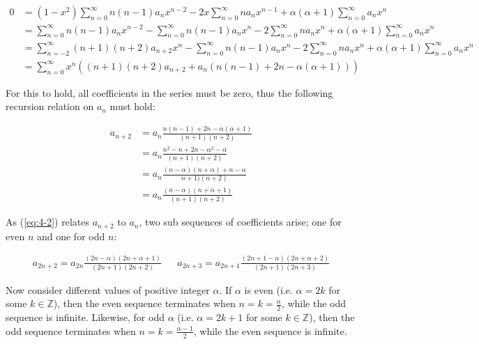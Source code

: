 \documentclass{article}
\begin{document}
\begin{align*}
    0 &= (1 - x^2)\sum\limits_{n = 0}^\infty n(n - 1)a_nx^{n - 2} - 2x\sum\limits_{n = 0}^\infty na_nx^{n - 1} + \alpha(\alpha + 1)\sum\limits_{n = 0}^\infty a_nx^n\\
    &= \sum\limits_{n = 0}^\infty n(n - 1)a_nx^{n - 2} - \sum\limits_{n = 0}^\infty n(n - 1)a_nx^n
        - 2\sum\limits_{n = 0}^\infty na_nx^n + \alpha(\alpha + 1)\sum\limits_{n = 0}^\infty a_nx^n\\
    &= \sum\limits_{n = -2}^\infty(n + 1)(n + 2)a_{n + 2}x^n - \sum\limits_{n = 0}^\infty n(n - 1)a_nx^n
        - 2\sum\limits_{n = 0}^\infty na_nx^n + \alpha(\alpha + 1)\sum\limits_{n = 0}^\infty a_nx^n\\
    &= \sum\limits_{n = 0}^\infty x^n((n + 1)(n + 2)a_{n + 2} + a_n(n(n - 1) + 2n - \alpha(\alpha + 1)))
\end{align*}

For this to hold, all coefficients in the series must be zero, thus the following recursion relation on $a_n$ must hold:

\begin{align}
    a_{n + 2} &= a_n \frac{n(n - 1) + 2n - \alpha(\alpha + 1)}{(n + 1)(n + 2)}\nonumber\\
    &= a_n \frac{n^2 - n + 2n - \alpha^2 - \alpha}{(n + 1)(n + 2)}\nonumber\\
    &= a_n \frac{(n - \alpha)(n + \alpha) + n - \alpha}{n + 1)(n + 2)}\nonumber\\
    &= a_n \frac{(n - \alpha)(n + \alpha + 1)}{(n + 1)(n + 2)} \label{eq:4-2}
\end{align}

As (\ref{eq:4-2}) relates $a_{n + 2}$ to $a_n$, two sub sequences of coefficients arise; one for even $n$ and one for odd $n$:

\begin{align*}
    a_{2n + 2} = a_{2n} \frac{(2n - \alpha)(2n + \alpha + 1)}{(2n + 1)(2n + 2)}
        && a_{2n + 3} = a_{2n + 1} \frac{(2n + 1 - \alpha)(2n + \alpha + 2)}{(2n + 1)(2n + 3)}
\end{align*}

Now consider different values of positive integer $\alpha$. If $\alpha$ is even (i.e. $\alpha = 2k$ for some $k \in \mathbb{Z}$), then the even
sequence terminates when $n = k = \frac{\alpha}{2}$, while the odd sequence is infinite. Likewise, for odd $\alpha$ (i.e. $\alpha = 2k + 1$ for some $k \in \mathbb{Z}$),
then the odd sequence terminates when $n = k = \frac{\alpha - 1}{2}$, while the even sequence is infinite.
\end{document}
